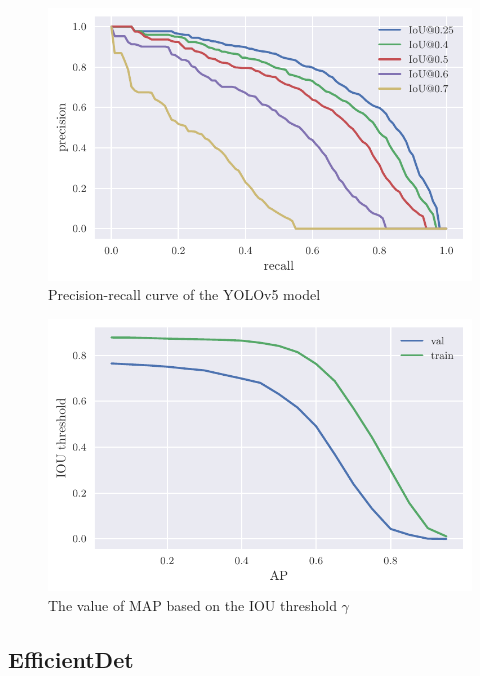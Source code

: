 \begin{paracol}{2}
    \begin{figure}
        \includegraphics[width=\linewidth]{images/iou_val_multiple.pdf}
        \caption{Precision-recall curve of the YOLOv5 model}
        \label{fig:yolov5_pr_curves}
    \end{figure}
    \switchcolumn
    \begin{figure}
        \includegraphics[width=\linewidth]{images/iou_threshold.pdf}
        \caption{The value of MAP based on the IOU threshold $\gamma$}
        \label{fig:yolov5_map_iou_thresholds}
    \end{figure}
\end{paracol}

\subsection{EfficientDet}

